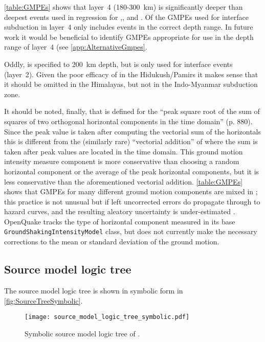 \documentclass{article}
\begin{document}
\autoref{table:GMPEs} shows that layer~4 (180-300~km) is significantly deeper than deepest events used in regression for \citet[100~km]{atkinson2003empirical},\citet[161~km]{lin2008ground}, \citet[120~km]{zhao2006attenuation} and \citet[148~km]{gupta2010response}. 
Of the GMPEs used for interface subduction in layer~4 only \citet[229~km]{youngs1997strong} includes events in the correct depth range.
In future work it would be beneficial to identify GMPEs appropriate for use in the depth range of layer~4 (see \autoref{app:AlternativeGmpes}.

Oddly, \cite{kanno2006new} is specified to 200~km depth, but is only used for interface events (layer~2).
Given the poor efficacy of \cite{kanno2006new} in the Hidukush/Pamirs it makes sense that it should be omitted in the Himalayas, but not in the Indo-Myanmar subduction zone.

It should be noted, finally, that \cite{kanno2006new} is defined for the ``peak square root of the sum of squares of two orthogonal horizontal components in the time domain'' (p. 880). Since the peak value is taken after computing the vectorial sum of the horizontals this is different from the (similarly rare) ``vectorial addition'' of \cite{douglas2003earthquake} where the sum is taken after  peak values are located in the time domain. 
This ground motion intensity measure component is more conservative than choosing a random horizontal component or the average of the peak horizontal components, but it is less conservative than the aforementioned vectorial addition. 
\autoref{table:GMPEs} shows that GMPEs for many different ground motion components are mixed in \cite{nath2012probabilistic}; this practice is not unusual but if left uncorrected errors do propagate through to hazard curves, and the resulting aleatory uncertainty is under-estimated \cite{beyer2006relationships}. 
OpenQuake tracks the type of horizontal component measured in its base \texttt{GroundShakingIntensityModel} class, but  does not currently make the necessary corrections to the mean or standard deviation of the ground motion.

\subsection{Source model logic tree}
\label{subsec:SourceTree}

The source model logic tree is shown in symbolic form in \autoref{fig:SourceTreeSymbolic}.

\begin{figure}[!htb]
\begin{adjustbox}{center}
\texttt{[image: source\_model\_logic\_tree\_symbolic.pdf]}
\end{adjustbox}
\caption[Symbolic source model logic tree]{Symbolic source model logic tree of \cite{nath2012probabilistic}.}
\label{fig:SourceTreeSymbolic}
\end{figure}
\end{document}
